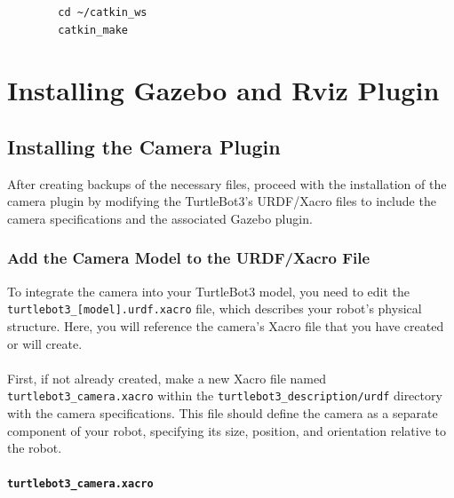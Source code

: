 \documentclass[12pt,a4paper]{article}
\begin{document}
	\begin{verbatim}
		cd ~/catkin_ws
		catkin_make
	\end{verbatim}
	\clearpage
	\section{Installing Gazebo and Rviz Plugin}
	\subsection{Installing the Camera Plugin}
	After creating backups of the necessary files, proceed with the installation of the camera plugin by modifying the TurtleBot3's URDF/Xacro files to include the camera specifications and the associated Gazebo plugin.
	
	\subsubsection{Add the Camera Model to the URDF/Xacro File}
	To integrate the camera into your TurtleBot3 model, you need to edit the\\
	\texttt{turtlebot3\_[model].urdf.xacro} file, which describes your robot's physical structure. Here, you will reference the camera's Xacro file that you have created or will create.
	\\\\
	First, if not already created, make a new Xacro file named 
	\texttt{turtlebot3\_camera.xacro} within the \texttt{turtlebot3\_description/urdf} directory with the camera specifications. This file should define the camera as a separate component of your robot, specifying its size, position, and orientation relative to the robot.
	\\\\
	\noindent\textbf{\texttt{turtlebot3\_camera.xacro}}
\end{document}
